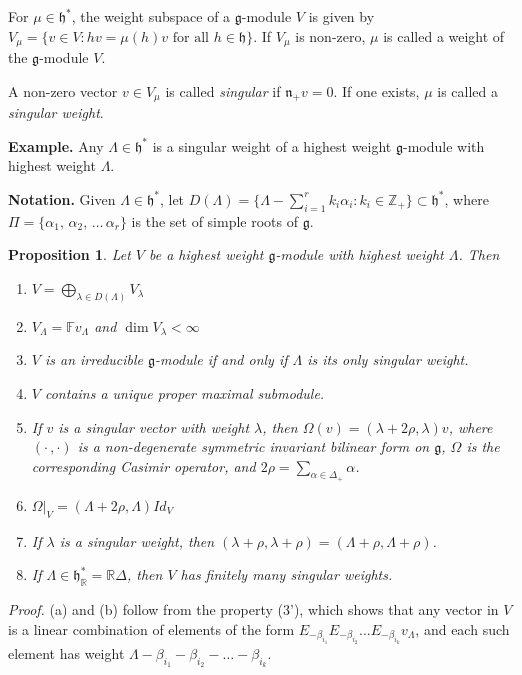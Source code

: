 \documentclass[11pt]{article}
\newtheorem{prop}{Proposition}
\begin{document}
For $\mu \in {\mathfrak h}^*$, the weight subspace of a ${\mathfrak g}$-module $V$ is given by $V_\mu = \{ v \in V : h v =  \mu (h)v \mbox{ for all } h \in {\mathfrak h} \}$. If $V_\mu$ is non-zero, $\mu$ is called a weight of the ${\mathfrak g}$-module $V$.

A non-zero vector $v \in V_\mu$ is called \emph{singular} if ${\mathfrak n}_+ v = 0$. If one exists, $\mu$ is called a \emph{singular weight}.

\textbf{Example.} Any $\Lambda \in {\mathfrak h}^*$ is a singular weight of a highest weight ${\mathfrak g}$-module with highest weight $\Lambda$.

\textbf{Notation.} Given $\Lambda \in {\mathfrak h}^*$, let $D(\Lambda) = \{ \Lambda - \sum_{i=1}^r k_i \alpha_i : k_i \in \mathbb{Z}_+ \} \subset {\mathfrak h}^*$, where $\Pi = \{ \alpha_1,\, \alpha_2,\, \ldots \, \alpha_r \}$ is the set of simple roots of ${\mathfrak g}$.

\begin{prop} Let $V$ be a highest weight ${\mathfrak g}$-module with highest weight $\Lambda$. Then
\begin{enumerate}
\item[(a)] $V = \bigoplus_{\lambda \in D(\Lambda)}V_\lambda$
\item[(b)] $V_\Lambda = \mathbb{F}v_\Lambda$ and $\dim V_\lambda < \infty$
\item[(c)] $V$ is an irreducible ${\mathfrak g}$-module if and only if $\Lambda$ is its only singular weight.
\item[(d)] $V$ contains a unique proper maximal submodule.
\item[(e)] If $v$ is a singular vector with weight $\lambda$, then $\Omega (v) = (\lambda + 2\rho, \lambda)v$, where $(\cdot \, , \cdot )$ is a non-degenerate symmetric invariant bilinear form on ${\mathfrak g}$, $\Omega$ is the corresponding Casimir operator, and $2\rho = \sum_{\alpha \in \Delta_+} \alpha$.
\item[(f)] $\Omega|_V = (\Lambda + 2\rho, \Lambda) Id_V$
\item[(g)] If $\lambda$ is a singular weight, then $(\lambda + \rho, \lambda + \rho)=(\Lambda + \rho, \Lambda + \rho)$.
\item[(h)] If $\Lambda \in {\mathfrak h}^*_{\mathbb{R}} = \mathbb{R} \Delta$, then $V$ has finitely many singular weights.
\end{enumerate}
\end{prop}

\emph{Proof.} (a) and (b) follow from the property (3'), which shows that any vector in $V$ is a linear combination of elements of the form $E_{-\beta_{i_1}}E_{-\beta_{i_2}} \ldots E_{-\beta_{i_k}}v_\Lambda$, and each such element has weight $\Lambda - \beta_{i_1}-\beta_{i_2} - \ldots - \beta_{i_k}$.
\end{document}
